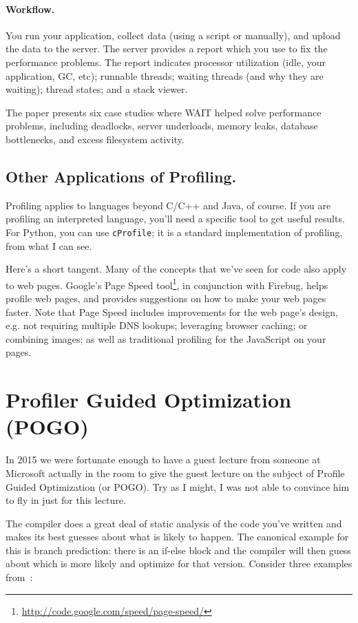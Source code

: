 \documentclass[a4paper]{report}
\begin{document}
\paragraph{Workflow.} You run your application, collect data (using a
script or manually), and upload the data to the server. The server provides
a report which you use to fix the performance problems.
The report indicates processor utilization (idle, your application, GC, 
etc); runnable threads; waiting threads (and why they are waiting); 
thread states; and a stack viewer.

The paper presents six case studies where WAIT helped solve performance
problems, including deadlocks, server underloads, memory leaks, database
bottlenecks, and excess filesystem activity.

\subsection*{Other Applications of Profiling.} 
Profiling applies to languages beyond C/C++ and Java, of course. If you are
profiling an interpreted language, you'll need a specific tool to get useful
results. For Python, you can use {\tt cProfile}; it is a standard implementation
of profiling, from what I can see.


Here's a short tangent. Many of the concepts that we've seen for code
also apply to web pages. Google's Page Speed
tool\footnote{\url{http://code.google.com/speed/page-speed/}}, in
conjunction with Firebug, helps profile web pages, and provides
suggestions on how to make your web pages faster. Note that Page Speed
includes improvements for the web page's design, e.g. not requiring
multiple DNS lookups; leveraging browser caching; or combining images;
as well as traditional profiling for the JavaScript on your pages.


\section*{Profiler Guided Optimization (POGO)}

In 2015 we were fortunate enough to have a guest lecture from someone at Microsoft actually in the room to give the guest lecture on the subject of Profile Guided Optimization (or POGO). Try as I might, I was not able to convince him to fly in just for this lecture. 

The compiler does a great deal of static analysis of the code you've written and makes its best guesses about what is likely to happen. The canonical example for this is branch prediction: there is an if-else block and the compiler will then guess about which is more likely and optimize for that version. Consider three examples from~\cite{pogo}:
\end{document}
